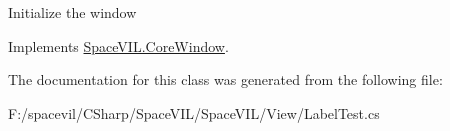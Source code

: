 Initialize the window 



Implements \mbox{\hyperlink{class_space_v_i_l_1_1_core_window_aa3cf4ac54d9651b1149584dc81042824}{Space\+V\+I\+L.\+Core\+Window}}.



The documentation for this class was generated from the following file\+:\begin{DoxyCompactItemize}
\item 
F\+:/spacevil/\+C\+Sharp/\+Space\+V\+I\+L/\+Space\+V\+I\+L/\+View/Label\+Test.\+cs\end{DoxyCompactItemize}
